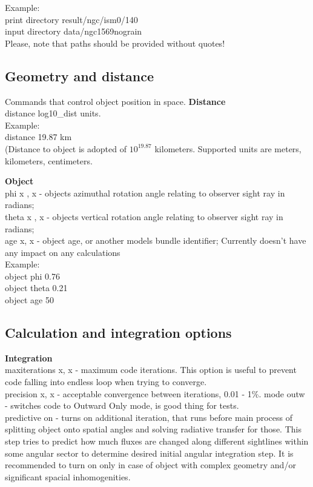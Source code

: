 \documentclass[a4paper]{article}
\begin{document}
Example:\\
print directory result/ngc/ism0/140\\
input directory data/ngc1569nograin\\
Please, note that paths should be provided without quotes!\\

\subsection{Geometry and distance}
Commands that control object position in space.
{\bf Distance}\\
distance log10\_dist units.\\

Example:\\ 
distance 19.87 km \\
(Distance to object is adopted of $10^{19.87}$ kilometers.
Supported units are meters, kilometers, centimeters.

{\bf Object}\\
phi x , x - objects azimuthal rotation angle relating to observer sight ray in radians;\\
theta x , x - objects vertical rotation angle relating to observer sight ray in radians;\\
age x, x - object age, or another models bundle identifier; Currently doesn't have any impact on any calculations\\

Example:\\
object phi 0.76\\
object theta 0.21\\
object age 50\\

\subsection{Calculation and integration options}
{\bf Integration}\\
maxiterations x, x - maximum code iterations. This option is useful to prevent code
falling into endless loop when trying to converge.\\
precision x, x - acceptable convergence between iterations, 0.01 - 1\%.
mode outw - switches code to Outward Only mode, is good thing for tests.\\
predictive on - turns on additional iteration, that runs before main process of splitting object onto spatial angles and solving
radiative transfer for those. This step tries to predict how much fluxes are changed along different sightlines within some angular sector
to determine desired initial angular integration step. It is recommended to turn on only in case of object with complex geometry and/or
significant spacial inhomogenities.
\end{document}
